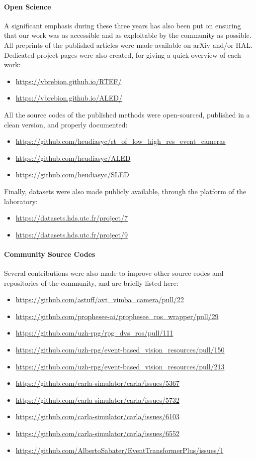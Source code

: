 \paragraph{Open Science}
A significant emphasis during these three years has also been put on ensuring that our work was as accessible and as exploitable by the community as possible. All preprints of the published articles were made available on arXiv and/or HAL. Dedicated project pages were also created, for giving a quick overview of each work:
\begin{itemize}\small
  \item \url{https://vbrebion.github.io/RTEF/}
  \item \url{https://vbrebion.github.io/ALED/}
\end{itemize}
All the source codes of the published methods were open-sourced, published in a clean version, and properly documented:
\begin{itemize}\small
  \item \url{https://github.com/heudiasyc/rt_of_low_high_res_event_cameras}
  \item \url{https://github.com/heudiasyc/ALED}
  \item \url{https://github.com/heudiasyc/SLED}
\end{itemize}
Finally, datasets were also made publicly available, through the platform of the laboratory:
\begin{itemize}\small
  \item \url{https://datasets.hds.utc.fr/project/7}
  \item \url{https://datasets.hds.utc.fr/project/9}
\end{itemize}

\paragraph{Community Source Codes}
Several contributions were also made to improve other source codes and repositories of the community, and are briefly listed here:
\begin{itemize}\small
  \item \url{https://github.com/astuff/avt_vimba_camera/pull/22}
  \item \url{https://github.com/prophesee-ai/prophesee_ros_wrapper/pull/29}
  \item \url{https://github.com/uzh-rpg/rpg_dvs_ros/pull/111}
  \item \url{https://github.com/uzh-rpg/event-based_vision_resources/pull/150}
  \item \url{https://github.com/uzh-rpg/event-based_vision_resources/pull/213}
  \item \url{https://github.com/carla-simulator/carla/issues/5367}
  \item \url{https://github.com/carla-simulator/carla/issues/5732}
  \item \url{https://github.com/carla-simulator/carla/issues/6103}
  \item \url{https://github.com/carla-simulator/carla/issues/6552}
  \item \url{https://github.com/AlbertoSabater/EventTransformerPlus/issues/1}
\end{itemize}


